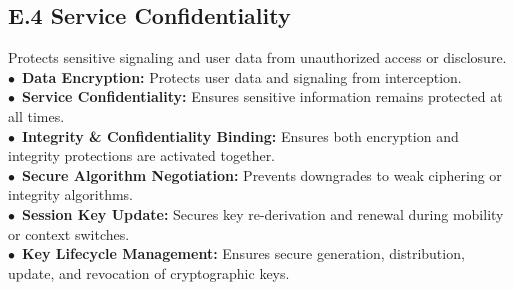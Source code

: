 \subsection*{E.4 Service Confidentiality}
Protects sensitive signaling and user data from unauthorized access or disclosure.\\
\noindent$\bullet$~\textbf{Data Encryption:} Protects user data and signaling from interception. \\  
\noindent$\bullet$~\textbf{Service Confidentiality:} Ensures sensitive information remains protected at all times.  \\
\noindent$\bullet$~\textbf{Integrity \& Confidentiality Binding:} Ensures both encryption and integrity protections are activated together.  \\
\noindent$\bullet$~\textbf{Secure Algorithm Negotiation:} Prevents downgrades to weak ciphering or integrity algorithms.  \\
\noindent$\bullet$~\textbf{Session Key Update:} Secures key re-derivation and renewal during mobility or context switches.  \\
\noindent$\bullet$~\textbf{Key Lifecycle Management:} Ensures secure generation, distribution, update, and revocation of cryptographic keys.  

